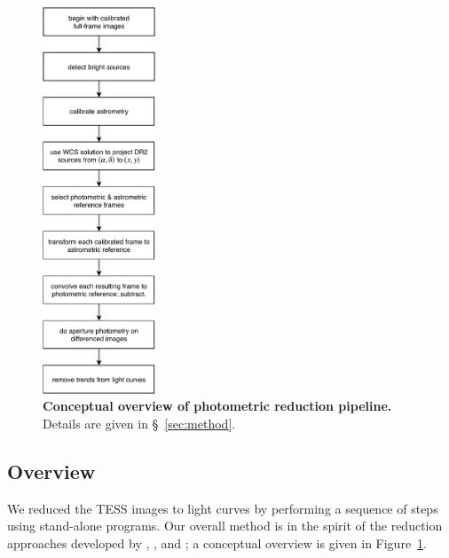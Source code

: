 \documentclass[12pt,twocolumn,tighten]{aastex62}
\begin{document}
\begin{figure}[t]
	\begin{center}
		\leavevmode
		\includegraphics[width=0.3\textwidth]{pipelineoverview.pdf}
	\end{center}
	\vspace{-0.2cm}
	\caption{
    {\bf Conceptual overview of photometric reduction pipeline.}
    Details are given in \S~\ref{sec:method}.
	\label{fig:pipeline}
	}
\end{figure}

\subsection{Overview}

We reduced the TESS images to light curves by performing a sequence of
steps using stand-alone programs.
Our overall method is in the spirit of the reduction approaches developed
by \citet{Pal_2009}, \citet{huang_high-precision_2015}, \citet{soares-furtado_image_2017} and
\citet{oelkers_precision_2018}; a conceptual overview is given in
Figure~\ref{fig:pipeline}.
\end{document}
